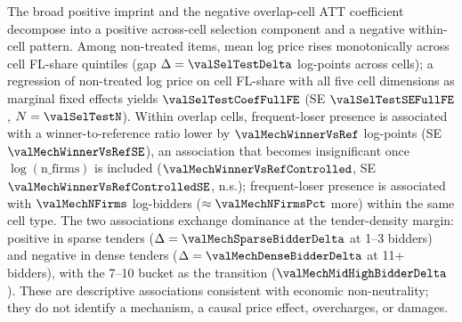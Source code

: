 The broad positive imprint and the negative overlap-cell ATT
coefficient decompose into a positive across-cell selection
component and a negative within-cell pattern. Among non-treated
items, mean log price rises monotonically across cell FL-share
quintiles (gap $\Delta=\valSelTestDelta$ log-points across cells);
a regression of non-treated log price on cell FL-share with all
five cell dimensions as marginal fixed effects yields
$\valSelTestCoefFullFE$ (SE $\valSelTestSEFullFE$,
$N=\valSelTestN$). Within overlap cells, frequent-loser presence
is associated with a winner-to-reference ratio lower by
$\valMechWinnerVsRef$ log-points (SE $\valMechWinnerVsRefSE$),
an association that becomes insignificant once
$\log(\text{n\_firms})$ is included ($\valMechWinnerVsRefControlled$,
SE $\valMechWinnerVsRefControlledSE$, n.s.); frequent-loser
presence is associated with $\valMechNFirms$ log-bidders
($\approx\valMechNFirmsPct$ more) within the same cell type. The
two associations exchange dominance at the tender-density margin:
positive in sparse tenders ($\Delta=\valMechSparseBidderDelta$ at
1--3 bidders) and negative in dense tenders
($\Delta=\valMechDenseBidderDelta$ at 11+ bidders), with the
7--10 bucket as the transition ($\valMechMidHighBidderDelta$).
These are descriptive associations consistent with economic
non-neutrality; they do not identify a mechanism, a causal price
effect, overcharges, or damages.

